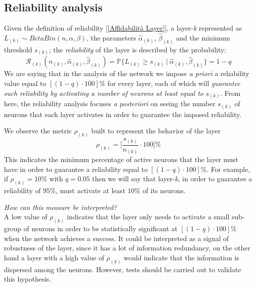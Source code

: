 \documentclass[10pt]{article} %
\begin{document}
\subsection{Reliability analysis}
Given the definition of reliability [\ref{Affidabilità Layer}], a layer-\textit{k} represented as $L_{(k)}\sim BetaBin(n, \alpha, \beta)$, the parameters $\hat{\alpha}_{(k)}$, $\hat{\beta}_{(k)}$ and the minimum threshold $s_{(k)}$; the \textit{reliability} of the layer is described by the probability:
\begin{equation}
    \mathcal{R}_{(k)}(n_{(k)}, \hat{\alpha}_{(k)}, \hat{\beta}_{(k)}) = \mathbb{P}\{L_{(k)}\ge s_{(k)}\ |\ \hat{\alpha}_{(k)}, \hat{\beta}_{(k)}\} = 1-q
\end{equation}
We are saying that in the analysis of the network we impose \textit{a priori} a reliability value equal to $[(1-q)\cdot 100]\%$ for every layer, each of which will \textit{guarantee such reliability by activating a number of neurons at least equal to} $s_{(k)}$. From here, the reliability analysis focuses \textit{a posteriori} on seeing the number $s_{(k)}$ of neurons that each layer activates in order to guarantee the imposed reliability.

We observe the metric $\rho_{(k)}$ built to represent the behavior of the layer
\begin{equation}
    \rho_{(k)} = \bigg[\dfrac{s_{(k)}}{n_{(k)}}\cdot100\bigg]\%
\end{equation}
This indicates the minimum percentage of active neurons that the layer must have in order to guarantee a reliability equal to $[(1-q)\cdot 100]\%$. For example, if $\rho_{(k)}=10\%$ with $q=0.05$ then we will say that layer-\textit{k}, in order to guarantee a reliability of $95\%$, must activate at least $10\%$ of its neurons.

\textit{How can this measure be interpreted?}\\
A low value of $\rho_{(k)}$ indicates that the layer only needs to activate a small sub-group of neurons in order to be statistically significant at $[(1-q)\cdot100]\%$ when the network achieves a success. It could be interpreted as a signal of robustness of the layer, since it has a lot of information redundancy, on the other hand a layer with a high value of $\rho_{(k)}$ would indicate that the information is dispersed among the neurons. However, tests should be carried out to validate this hypothesis.
\end{document}
